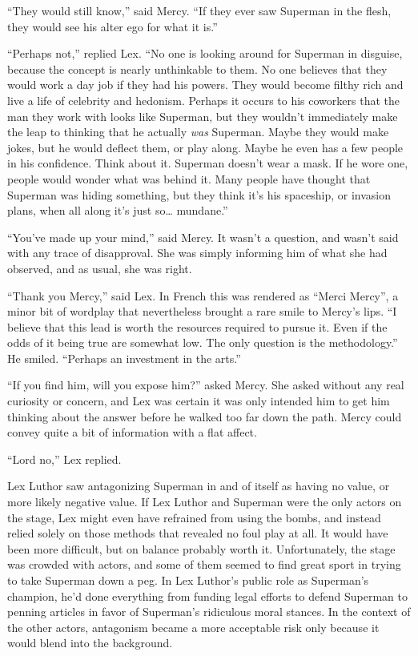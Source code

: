 ``They would still know,'' said Mercy. ``If they ever saw Superman in
the flesh, they would see his alter ego for what it is.''

``Perhaps not,'' replied Lex. ``No one is looking around for Superman in
disguise, because the concept is nearly unthinkable to them. No one
believes that they would work a day job if they had his powers. They
would become filthy rich and live a life of celebrity and hedonism.
Perhaps it occurs to his coworkers that the man they work with looks
like Superman, but they wouldn't immediately make the leap to thinking
that he actually \emph{was} Superman. Maybe they would make jokes, but
he would deflect them, or play along. Maybe he even has a few people in
his confidence. Think about it. Superman doesn't wear a mask. If he wore
one, people would wonder what was behind it. Many people have thought
that Superman was hiding something, but they think it's his spaceship,
or invasion plans, when all along it's just so\ldots{} mundane.''

``You've made up your mind,'' said Mercy. It wasn't a question, and
wasn't said with any trace of disapproval. She was simply informing him
of what she had observed, and as usual, she was right.

``Thank you Mercy,'' said Lex. In French this was rendered as ``Merci
Mercy'', a minor bit of wordplay that nevertheless brought a rare smile
to Mercy's lips. ``I believe that this lead is worth the resources
required to pursue it. Even if the odds of it being true are somewhat
low. The only question is the methodology.'' He smiled. ``Perhaps an
investment in the arts.''

``If you find him, will you expose him?'' asked Mercy. She asked without
any real curiosity or concern, and Lex was certain it was only intended
him to get him thinking about the answer before he walked too far down
the path. Mercy could convey quite a bit of information with a flat
affect.

``Lord no,'' Lex replied.

Lex Luthor saw antagonizing Superman in and of itself as having no
value, or more likely negative value. If Lex Luthor and Superman were
the only actors on the stage, Lex might even have refrained from using
the bombs, and instead relied solely on those methods that revealed no
foul play at all. It would have been more difficult, but on balance
probably worth it. Unfortunately, the stage was crowded with actors, and
some of them seemed to find great sport in trying to take Superman down
a peg. In Lex Luthor's public role as Superman's champion, he'd done
everything from funding legal efforts to defend Superman to penning
articles in favor of Superman's ridiculous moral stances. In the context
of the other actors, antagonism became a more acceptable risk only
because it would blend into the background.

